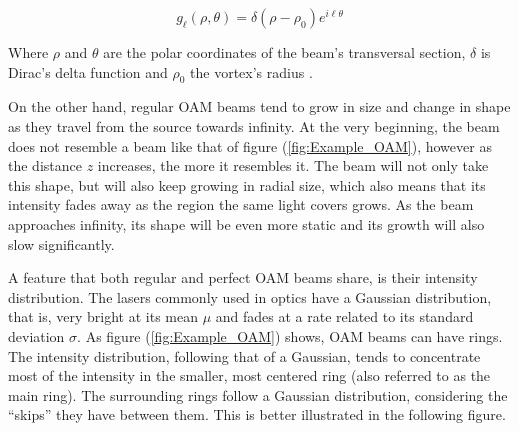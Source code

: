 \begin{equation}
    g_\ell (\rho,\theta) = \delta (\rho - \rho_0)e^{i\ell\theta}
    \label{eq:perfect_vortex_intensity}
\end{equation}

Where $\rho$ and $\theta$ are the polar coordinates of the beam's transversal section, $\delta$ is Dirac's delta function and $\rho_0$ the vortex's radius \cite{Kotlyar:16}.

On the other hand, regular OAM beams tend to grow in size and change in shape as they travel from the source towards infinity. At the very beginning, the beam does not resemble a beam like that of figure (\ref{fig:Example_OAM}), however as the distance $z$ increases, the more it resembles it. The beam will not only take this shape, but will also keep growing in radial size, which also means that its intensity fades away as the region the same light covers grows. As the beam approaches infinity, its shape will be even more static and its growth will also slow significantly.

A feature that both regular and perfect OAM beams share, is their intensity distribution. The lasers commonly used in optics have a Gaussian distribution, that is, very bright at its mean $\mu$ and fades at a rate related to its standard deviation $\sigma$. As figure (\ref{fig:Example_OAM}) shows, OAM beams can have rings. The intensity distribution, following that of a Gaussian, tends to concentrate most of the intensity in the smaller, most centered ring (also referred to as the main ring). The surrounding rings follow a Gaussian distribution, considering the ``skips'' they have between them. This is better illustrated in the following figure.


